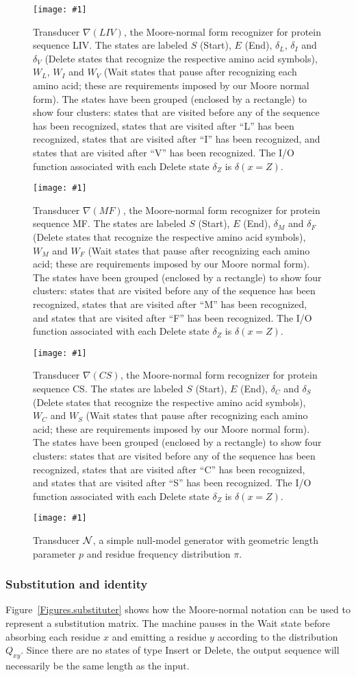 \documentclass{article}
\newcommand{\figref}[1]{Figure~\ref{Figures.#1}}
\newcommand{\figlabel}[1]{\label{Figures.#1}}
\newcommand{\easyfig}[4]{
\begin{figure}
\texttt{[image: \#1]}
\caption{ \figlabel{#3} #4}
\end{figure}}
\newcommand{\pdffig}[2]{\easyfig{#1-fig.pdf}{}{#1}{#2}}
\newcommand{\widepdffig}[2]{\easyfig{#1-fig.pdf}{width=\textwidth}{#1}{#2}}
\newcommand\nullmodel{{\cal N}}
\newcommand\recognize{\nabla}
\begin{document}
\widepdffig{liv-labeled}{Transducer $\recognize(LIV)$, the Moore-normal form recognizer for protein sequence LIV.
The states are labeled $S$ (Start), $E$ (End),
$\delta_L$, $\delta_I$ and $\delta_V$ (Delete states that recognize the respective amino acid symbols),
$W_L$, $W_I$ and $W_V$ (Wait states that pause after recognizing each amino acid;
these are requirements imposed by our Moore normal form).
The states have been grouped (enclosed by a rectangle) to show four clusters:
 states that are visited before any of the sequence has been recognized,
 states that are visited after ``L'' has been recognized,
 states that are visited after ``I'' has been recognized,
and
 states that are visited after ``V'' has been recognized.
The I/O function associated with each Delete state $\delta_Z$ is $\delta(x=Z)$.}
\widepdffig{mf-labeled}{Transducer $\recognize(MF)$, the Moore-normal form recognizer for protein sequence MF.
The states are labeled $S$ (Start), $E$ (End),
$\delta_M$ and $\delta_F$ (Delete states that recognize the respective amino acid symbols),
$W_M$ and $W_F$ (Wait states that pause after recognizing each amino acid;
these are requirements imposed by our Moore normal form).
The states have been grouped (enclosed by a rectangle) to show four clusters:
 states that are visited before any of the sequence has been recognized,
 states that are visited after ``M'' has been recognized,
and
 states that are visited after ``F'' has been recognized.
The I/O function associated with each Delete state $\delta_Z$ is $\delta(x=Z)$.}
\widepdffig{cs-labeled}{Transducer $\recognize(CS)$, the Moore-normal form recognizer for protein sequence CS.
The states are labeled $S$ (Start), $E$ (End),
$\delta_C$ and $\delta_S$ (Delete states that recognize the respective amino acid symbols),
$W_C$ and $W_S$ (Wait states that pause after recognizing each amino acid;
these are requirements imposed by our Moore normal form).
The states have been grouped (enclosed by a rectangle) to show four clusters:
 states that are visited before any of the sequence has been recognized,
 states that are visited after ``C'' has been recognized,
and
 states that are visited after ``S'' has been recognized.
The I/O function associated with each Delete state $\delta_Z$ is $\delta(x=Z)$.}
\pdffig{null-model}{Transducer $\nullmodel$, a simple null-model generator with geometric length parameter $p$ and residue frequency distribution $\pi$.}

\subsubsection{Substitution and identity}
\figref{substituter} shows how the Moore-normal notation can be  used to represent a substitution matrix.  
The machine pauses in the Wait state before absorbing each residue $x$ and emitting a residue $y$
according to the distribution $Q_{xy}$.  
Since there are no states of type Insert or Delete, the output sequence will necessarily
be the same length as the input.  
\end{document}
